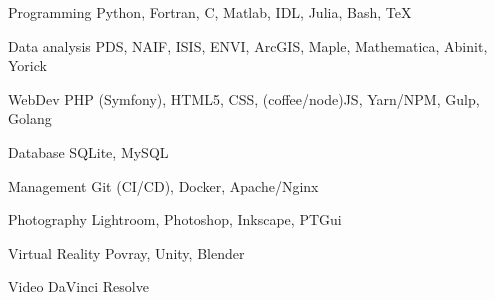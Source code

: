 
\begin{cvskills}

	\cvskill
	{Programming}
    {Python, Fortran, C, Matlab, IDL, Julia, Bash, \TeX}

	\cvskill
	{Data analysis}
    {PDS, NAIF, ISIS, ENVI, ArcGIS, Maple, Mathematica, Abinit, Yorick}

	\cvskill
    {WebDev}
    {PHP (Symfony), HTML5, CSS, (coffee/node)JS, Yarn/NPM, Gulp, Golang}

	\cvskill
    {Database}
    {SQLite, MySQL}

	\cvskill
    {Management}
    {Git (CI/CD), Docker, Apache/Nginx}

	\cvskill
    {Photography}
    {Lightroom, Photoshop, Inkscape, PTGui}

    \cvskill
    {Virtual Reality}
    {Povray, Unity, Blender}

    \cvskill
    {Video}
    {DaVinci Resolve}

\end{cvskills}
